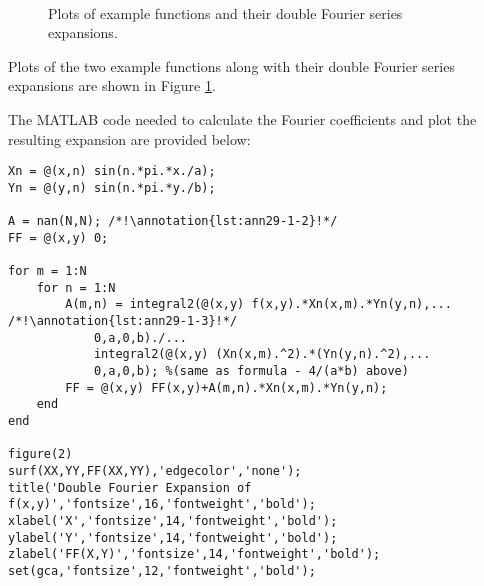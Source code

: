 \begin{figure}[h!]
 \\
\label{fig:lec29-dfexp}
\caption{Plots of example functions and their double Fourier series expansions.}
\end{figure}
Plots of the two example functions along with their double Fourier series expansions are shown in Figure \ref{fig:lec29-dfexp}. 


The MATLAB code needed to calculate the Fourier coefficients and plot the resulting expansion are provided below:

\begin{lstlisting}[name=lec29-ex1,style=myMatlab]
%% Double Fourier Expansion
Xn = @(x,n) sin(n.*pi.*x./a);
Yn = @(y,n) sin(n.*pi.*y./b);

A = nan(N,N); /*!\annotation{lst:ann29-1-2}!*/
FF = @(x,y) 0;

for m = 1:N
    for n = 1:N
        A(m,n) = integral2(@(x,y) f(x,y).*Xn(x,m).*Yn(y,n),... /*!\annotation{lst:ann29-1-3}!*/
            0,a,0,b)./...
            integral2(@(x,y) (Xn(x,m).^2).*(Yn(y,n).^2),...
            0,a,0,b); %(same as formula - 4/(a*b) above)
        FF = @(x,y) FF(x,y)+A(m,n).*Xn(x,m).*Yn(y,n);
    end
end

figure(2)
surf(XX,YY,FF(XX,YY),'edgecolor','none');
title('Double Fourier Expansion of f(x,y)','fontsize',16,'fontweight','bold');
xlabel('X','fontsize',14,'fontweight','bold');
ylabel('Y','fontsize',14,'fontweight','bold');
zlabel('FF(X,Y)','fontsize',14,'fontweight','bold');
set(gca,'fontsize',12,'fontweight','bold');
\end{lstlisting}



